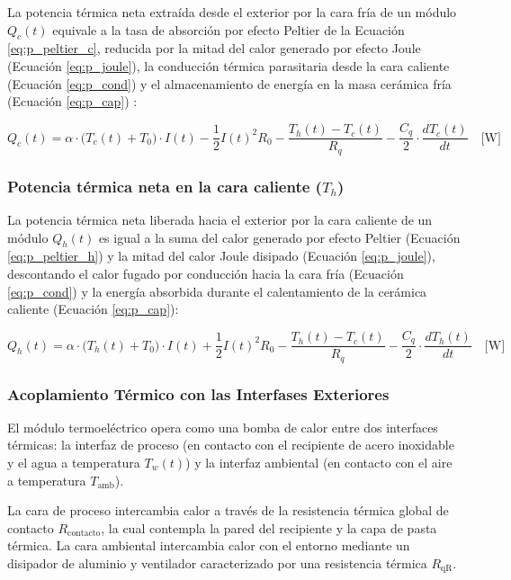\documentclass[12pt, a4paper]{article}
\begin{document}
La potencia térmica neta extraída desde el exterior por la cara fría de un módulo $Q_c(t)$ equivale a la tasa de absorción por efecto Peltier de la Ecuación \eqref{eq:p_peltier_c}, reducida por la mitad del calor generado por efecto Joule (Ecuación \eqref{eq:p_joule}), la conducción térmica parasitaria desde la cara caliente (Ecuación \eqref{eq:p_cond}) y el almacenamiento de energía en la masa cerámica fría (Ecuación \eqref{eq:p_cap}) \parencite{Kubov_2016}:

\begin{equation}
    Q_c(t) = \alpha \cdot \big(T_c(t) + T_0\big) \cdot I(t) - \frac{1}{2} I(t)^2 R_0 - \frac{T_h(t) - T_c(t)}{R_q} - \frac{C_q}{2} \cdot \frac{dT_c(t)}{dt} \quad \text{[W]}
    \label{eq:qc_net}
\end{equation}

\subsubsection{Potencia térmica neta en la cara caliente ($T_h$)}

La potencia térmica neta liberada hacia el exterior por la cara caliente de un módulo $Q_h(t)$ es igual a la suma del calor generado por efecto Peltier (Ecuación \eqref{eq:p_peltier_h}) y la mitad del calor Joule disipado (Ecuación \eqref{eq:p_joule}), descontando el calor fugado por conducción hacia la cara fría (Ecuación \eqref{eq:p_cond}) y la energía absorbida durante el calentamiento de la cerámica caliente (Ecuación \eqref{eq:p_cap}):

\begin{equation}
    Q_h(t) = \alpha \cdot \big(T_h(t) + T_0\big) \cdot I(t) + \frac{1}{2} I(t)^2 R_0 - \frac{T_h(t) - T_c(t)}{R_q} - \frac{C_q}{2} \cdot \frac{dT_h(t)}{dt} \quad \text{[W]}
    \label{eq:qh_net}
\end{equation}

\subsubsection{Acoplamiento Térmico con las Interfases Exteriores}

El módulo termoeléctrico opera como una bomba de calor entre dos interfaces térmicas: la interfaz de proceso (en contacto con el recipiente de acero inoxidable y el agua a temperatura $T_w(t)$) y la interfaz ambiental (en contacto con el aire a temperatura $T_{\text{amb}}$).

La cara de proceso intercambia calor a través de la resistencia térmica global de contacto $R_{\text{contacto}}$, la cual contempla la pared del recipiente y la capa de pasta térmica. La cara ambiental intercambia calor con el entorno mediante un disipador de aluminio y ventilador caracterizado por una resistencia térmica $R_{\text{qR}}$.
\end{document}
